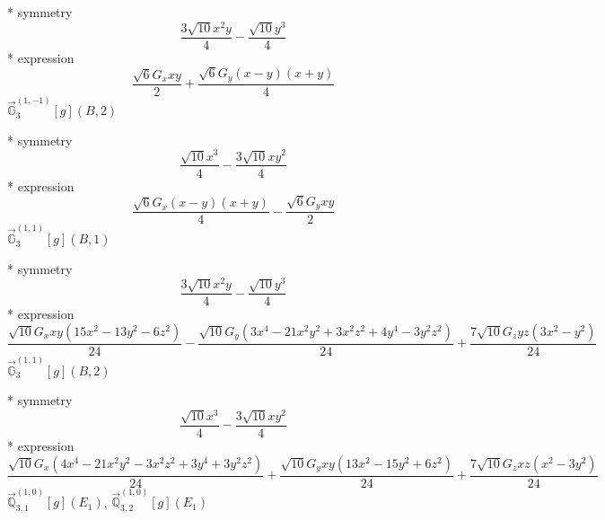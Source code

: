 \documentclass[fleqn,8pt]{jsarticle}
\begin{document}
\noindent\quad ** symmetry
\begin{dmath*}
\frac{3 \sqrt{10} x^{2} y}{4} - \frac{\sqrt{10} y^{3}}{4}
\end{dmath*}
\noindent\quad ** expression
\begin{dmath*}
\frac{\sqrt{6} G_{x} x y}{2} + \frac{\sqrt{6} G_{y} \left(x - y\right) \left(x + y\right)}{4}
\end{dmath*}
\noindent\quad $\vec{\mathbb{G}}_{3}^{(1,-1)}[g](B,2)$

\noindent\quad ** symmetry
\begin{dmath*}
\frac{\sqrt{10} x^{3}}{4} - \frac{3 \sqrt{10} x y^{2}}{4}
\end{dmath*}
\noindent\quad ** expression
\begin{dmath*}
\frac{\sqrt{6} G_{x} \left(x - y\right) \left(x + y\right)}{4} - \frac{\sqrt{6} G_{y} x y}{2}
\end{dmath*}
\noindent\quad $\vec{\mathbb{G}}_{3}^{(1,1)}[g](B,1)$

\noindent\quad ** symmetry
\begin{dmath*}
\frac{3 \sqrt{10} x^{2} y}{4} - \frac{\sqrt{10} y^{3}}{4}
\end{dmath*}
\noindent\quad ** expression
\begin{dmath*}
\frac{\sqrt{10} G_{x} x y \left(15 x^{2} - 13 y^{2} - 6 z^{2}\right)}{24} - \frac{\sqrt{10} G_{y} \left(3 x^{4} - 21 x^{2} y^{2} + 3 x^{2} z^{2} + 4 y^{4} - 3 y^{2} z^{2}\right)}{24} + \frac{7 \sqrt{10} G_{z} y z \left(3 x^{2} - y^{2}\right)}{24}
\end{dmath*}
\noindent\quad $\vec{\mathbb{G}}_{3}^{(1,1)}[g](B,2)$

\noindent\quad ** symmetry
\begin{dmath*}
\frac{\sqrt{10} x^{3}}{4} - \frac{3 \sqrt{10} x y^{2}}{4}
\end{dmath*}
\noindent\quad ** expression
\begin{dmath*}
\frac{\sqrt{10} G_{x} \left(4 x^{4} - 21 x^{2} y^{2} - 3 x^{2} z^{2} + 3 y^{4} + 3 y^{2} z^{2}\right)}{24} + \frac{\sqrt{10} G_{y} x y \left(13 x^{2} - 15 y^{2} + 6 z^{2}\right)}{24} + \frac{7 \sqrt{10} G_{z} x z \left(x^{2} - 3 y^{2}\right)}{24}
\end{dmath*}
\noindent\quad $\vec{\mathbb{Q}}_{3,1}^{(1,0)}[g](E_{1})$, $\vec{\mathbb{Q}}_{3,2}^{(1,0)}[g](E_{1})$
\end{document}
